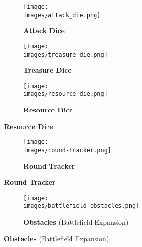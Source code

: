 \vspace*{-2em}
\begin{paracol}{2}
\begin{figure}[H]
  \centering
  \begin{subfigure}[b]{0.3\linewidth}
    \centering
    \texttt{[image: \\images/attack\_die.png]}
    \caption{\textbf{Attack Dice}}
  \end{subfigure}
  \begin{subfigure}[b]{0.3\linewidth}
    \centering
    \texttt{[image: \\images/treasure\_die.png]}
    \caption{\textbf{Treasure Dice}}
  \end{subfigure}
  \begin{subfigure}[b]{0.3\linewidth}
    \centering
    \texttt{[image: \\images/resource\_die.png]}
    \caption{\textbf{Resource Dice}}
  \end{subfigure}
\end{figure}
\vspace*{-1em}
\begin{figure}[H]
  \centering
  \begin{subfigure}[b]{\linewidth}
    \centering
    \texttt{[image: \\images/round-tracker.png]}
    \caption{\textbf{Round Tracker}}
  \end{subfigure}
\end{figure}
\switchcolumn
\begin{figure}[H]
  \vspace*{1em}
  \centering
  \begin{subfigure}[b]{\linewidth}
    \centering
    \texttt{[image: \\images/battlefield-obstacles.png]}
    \caption{\textbf{Obstacles} (Battlefield Expansion)}
  \end{subfigure}
\end{figure}
\end{paracol}
